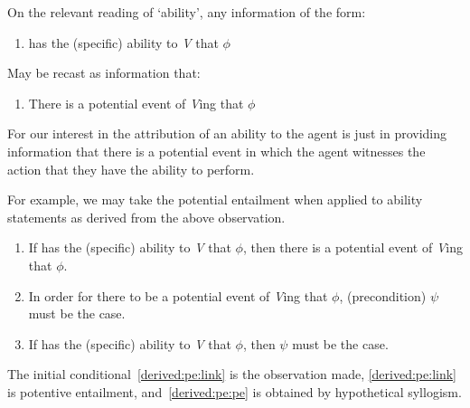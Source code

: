 \begin{note}
  On the relevant reading of `ability', any information of the form:
  \begin{enumerate}
  \item\label{PE:ability:agent} \agent{} has the (specific) ability to \emph{V} that \(\phi\)
  \end{enumerate}
  May be recast as information that:
  \begin{enumerate}
  \item\label{PE:ability:event} There is a potential event of \agent{} \emph{V}ing that \(\phi\)
  \end{enumerate}
  For our interest in the attribution of an ability to the agent is just in providing information that there is a potential event in which the agent witnesses the action that they have the ability to perform.

  For example, we may take the potential entailment when applied to ability statements as derived from the above observation.
  \begin{enumerate}
  \item\label{derived:pe:link} If \agent{} has the (specific) ability to \emph{V} that \(\phi\), then there is a potential event of \agent{} \emph{V}ing that \(\phi\).
  \item\label{derived:pe:pe} In order for there to be a potential event of \agent{} \emph{V}ing that \(\phi\), (precondition) \(\psi\) must be the case.
  \item\label{derived:pe:result} If \agent{} has the (specific) ability to \emph{V} that \(\phi\), then \(\psi\) must be the case.
  \end{enumerate}
  The initial conditional~\ref{derived:pe:link} is the observation made, \ref{derived:pe:link} is potentive entailment, and~\ref{derived:pe:pe} is obtained by hypothetical syllogism.
\end{note}

